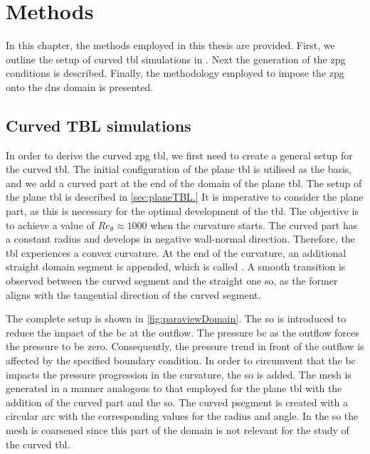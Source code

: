 
\chapter{Methods} \label{chap:methods}


In this chapter, the methods employed in this thesis are provided. 
First, we outline the setup of curved \acrshort{tbl} simulations in .
Next the generation of the \acrshort{zpg} conditions is described.
Finally, the methodology employed to impose the \acrshort{zpg}  onto the \acrshort{dns} domain is presented.

\section{Curved TBL simulations}

In order to derive the curved \acrshort{zpg} \acrshort{tbl}, we first need to create a general setup for the curved \acrshort{tbl}. 
The initial configuration of the plane  \acrshort{tbl} is utilised as the basis, and we add a curved part at the end of the domain of the plane \acrshort{tbl}. 
The setup of the plane \acrshort{tbl} is described in \autoref{sec:planeTBL.}
It is imperative to consider the plane part, as this is necessary for the optimal development of the \acrshort{tbl}. The objective is to achieve
a value of $Re_{\theta} \approx 1000$ when the curvature starts. 
The curved part has a constant radius and develops in negative wall-normal direction. 
Therefore, the \acrshort{tbl} experiences a convex curvature. 
At the end of the curvature, an additional straight domain segment is appended, which is called .
A smooth transition is observed between the curved segment and the straight one \acrlong{so}, as the former aligns with the tangential direction of the curved segment. 

The complete setup is shown in \autoref{fig:paraviewDomain}.
The \acrlong{so} is introduced to reduce the impact of the \acrlong{bc} at the outflow. 
The pressure \acrshort{bc} as the outflow forces the pressure to be zero.
Consequently, the pressure trend in front of the outflow is affected by the specified boundary condition.
In order to circumvent  that the \acrshort{bc} impacts the pressure progression in the curvature, the \acrlong{so} is added.
The mesh is generated in a manner analogous to that employed for the plane  \acrshort{tbl} with the addition of the curved part and the \acrlong{so}.
The curved psegment is created with a circular arc with the corresponding values for the radius and angle.
In the \acrlong{so} the mesh is coarsened since this part of the domain is not relevant for the study of the curved \acrshort{tbl}. \\

